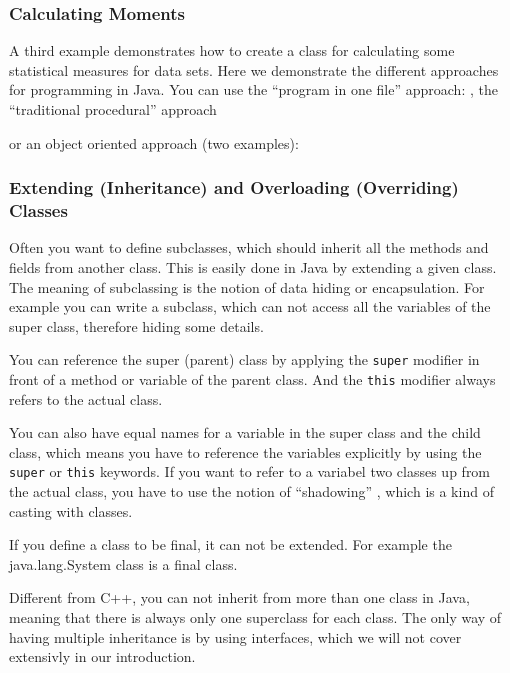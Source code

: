 \subsubsection{Calculating Moments}
A third example demonstrates how to create a class for calculating
some statistical measures for data sets. Here we demonstrate the
different approaches for programming in Java. You can use the
``program in one file'' approach: 
, the ``traditional procedural'' approach


or an object oriented approach (two examples): 




\subsubsection{Extending (Inheritance) and Overloading (Overriding) Classes}
Often you want to define subclasses, which should inherit all
the methods and fields from another class. This is easily done
in Java by extending a given class. The meaning of subclassing is the
notion of data hiding or encapsulation. For example you can write
a subclass, which can not access all the variables of the super class,
therefore hiding some details. 

You can reference the super (parent) class by applying the
\verb|super| modifier in front of a method or variable of
the parent class. And the \verb|this| modifier always refers to
the actual class. 

You can also have equal names for a variable in the super class and the
child class, which means you have to reference the variables explicitly
by using the \verb|super| or \verb|this| keywords. If you want to refer
to a variabel two classes up from the actual class, you have to use
the notion of ``shadowing'' \cite[]{javanutshell}, which is a kind of
casting with classes. 

If you define a class to be final, it can not be extended.
For example the java.lang.System class is a final class.

Different from C++,  you can not inherit from more than one class
in Java, meaning that there is always only one superclass for each
class. 
The only way of having multiple inheritance is by using
interfaces, which we will not cover extensivly in our introduction.


